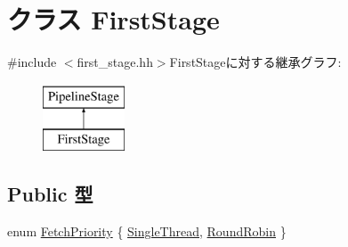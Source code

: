 \hypertarget{classFirstStage}{
\section{クラス FirstStage}
\label{classFirstStage}
}


{\ttfamily \#include $<$first\_\-stage.hh$>$}FirstStageに対する継承グラフ:\begin{figure}[H]
\begin{center}
\leavevmode
\includegraphics[height=2cm]{classFirstStage}
\end{center}
\end{figure}
\subsection*{Public 型}
\begin{DoxyCompactItemize}
\item 
enum \hyperlink{classFirstStage_a818d5f50fdcec74a1a445b4fa8b760e3}{FetchPriority} \{ \hyperlink{classFirstStage_a818d5f50fdcec74a1a445b4fa8b760e3ae01d52cbe97a50e79f4195cd27b3185b}{SingleThread}, 
\hyperlink{classFirstStage_a818d5f50fdcec74a1a445b4fa8b760e3a5c08841de48c15133dd26a4d9d740a11}{RoundRobin}
 \}
\end{DoxyCompactItemize}
